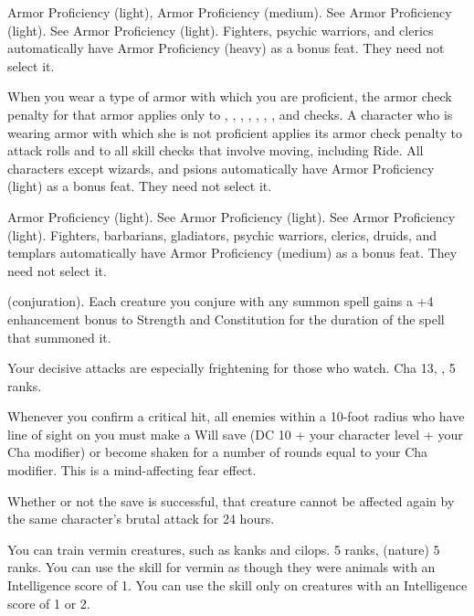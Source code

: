 {}
{Armor Proficiency (light), Armor Proficiency (medium).}
{See Armor Proficiency (light).}
{See Armor Proficiency (light).}
{Fighters, psychic warriors, and clerics automatically have Armor Proficiency (heavy) as a bonus feat. They need not select it.}

{}{}
{When you wear a type of armor with which you are proficient, the armor check penalty for that armor applies only to , , , , , , , and  checks.}
{A character who is wearing armor with which she is not proficient applies its armor check penalty to attack rolls and to all skill checks that involve moving, including Ride.}
{All characters except wizards, and psions automatically have Armor Proficiency (light) as a bonus feat. They need not select it.}

{}
{Armor Proficiency (light).}
{See Armor Proficiency (light).}
{See Armor Proficiency (light).}
{Fighters, barbarians, gladiators, psychic warriors, clerics, druids, and templars automatically have Armor Proficiency (medium) as a bonus feat. They need not select it.}

{ (conjuration).}
{Each creature you conjure with any summon spell gains a +4 enhancement bonus to Strength and Constitution for the duration of the spell that summoned it.}

{Your decisive attacks are especially frightening for those who watch.}
{Cha 13, ,  5 ranks.}
{Whenever you confirm a critical hit, all enemies within a 10-foot radius who have line of sight on you must make a Will save (DC 10 + \onehalf your character level + your Cha modifier) or become shaken for a
number of rounds equal to your Cha modifier. This is a mind-affecting fear effect.

Whether or not the save is successful, that creature cannot be affected again by the same character's brutal
attack for 24 hours.}{}{}

{You can train vermin creatures, such as kanks and cilops.}
{ 5 ranks,  (nature) 5 ranks.}
{You can use the  skill for vermin as though they were animals with an Intelligence score of 1.}
{You can use the  skill only on creatures with an Intelligence score of 1 or 2.}
{}

